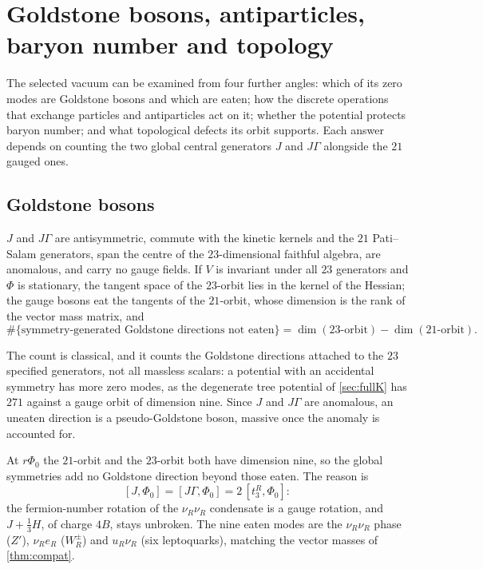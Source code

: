 \section{Goldstone bosons, antiparticles, baryon number and topology}
\label{sec:goldstone}

The selected vacuum can be examined from four further angles: which of its zero modes are Goldstone bosons and which are eaten; how the discrete
operations that exchange particles and antiparticles act on it; whether the potential protects baryon number; and what topological defects its orbit
supports. Each answer depends on counting the two global central generators $J$ and $J\Gamma$ alongside the $21$ gauged ones.

\subsection{Goldstone bosons}

\begin{proposition}
\label{prop:global}
$J$ and $J\Gamma$ are antisymmetric, commute with the kinetic kernels and the $21$ Pati--Salam generators, span the centre of the $23$-dimensional faithful
algebra, are anomalous, and carry no gauge fields. If $V$ is invariant under all $23$ generators and $\Phi$ is stationary, the tangent space of the $23$-orbit
lies in the kernel of the Hessian; the gauge bosons eat the tangents of the $21$-orbit, whose dimension is the rank of the vector mass matrix, and
\[
\#\{\text{symmetry-generated Goldstone directions not eaten}\}=\dim(23\text{-orbit})-\dim(21\text{-orbit}).
\]
\end{proposition}

The count is classical, and it counts the Goldstone directions attached to the $23$ specified generators, not all massless scalars: a potential with an
accidental symmetry has more zero modes, as the degenerate tree potential of \cref{sec:fullK} has $271$ against a gauge orbit of dimension nine. Since $J$
and $J\Gamma$ are anomalous, an uneaten direction is a pseudo-Goldstone boson, massive once the anomaly is accounted for.

\begin{theorem}[No Majoron]
\label{thm:nomajoron}
At $r\Phi_0$ the $21$-orbit and the $23$-orbit both have dimension nine, so the global symmetries add no Goldstone direction beyond those eaten. The reason is
\[
[J,\Phi_0]=[J\Gamma,\Phi_0]=2\,[t^R_3,\Phi_0]:
\]
the fermion-number rotation of the $\nu_R\nu_R$ condensate is a gauge rotation, and $J+\tfrac13H$, of charge $4B$, stays unbroken. The nine eaten modes are the
$\nu_R\nu_R$ phase ($Z'$), $\nu_Re_R$ ($W_R^\pm$) and $u_R\nu_R$ (six leptoquarks), matching the vector masses of \cref{thm:compat}.
\end{theorem}

